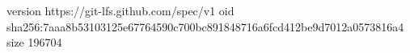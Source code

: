 version https://git-lfs.github.com/spec/v1
oid sha256:7aaa8b53103125e67764590c700bc891848716a6fcd412be9d7012a0573816a4
size 196704

